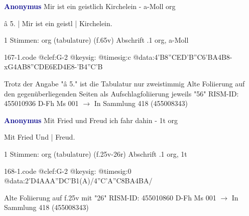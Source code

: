 \documentclass[twocolumn]{book}
\begin{document}
\newline \par \vspace{7pt} \textcolor{darkblue}{\textbf{Anonymus  }}
\newline Mir ist ein geistlich Kirchelein - a-Moll
\newline org
\newline \begin{itshape}[f.65v, at left:] â 5. | Mir ist ein geistl | Kirchelein.\end{itshape} 
\newline \textcolor{darkblue}{}  1 Stimmen: org (tabulature)  (f.65v)
\newline Abschrift
.1  org, a-Moll  
\begin{filecontents*}{167-1.code}
@clef:G-2
@keysig:
@timesig:c
@data:4'B{8''CE}{D'B''C6'BA}4B8-xG4AB{8''CDE6ED}4E8-'B4''C'B
\end{filecontents*}
\newline
%
\newline Trotz der Angabe "â 5." ist die Tabulatur nur zweistimmig
\newline Alte Foliierung auf den gegenüberliegenden Seiten als Aufschlagfoliierung jeweils "56"
\newline RISM-ID: 455010936
\newline D-Fh  Ms 001
\newline $\rightarrow$ In Sammlung 418 (455008343)
      
\newline \par \vspace{7pt} \textcolor{darkblue}{\textbf{Anonymus  }}
\newline Mit Fried und Freud ich fahr dahin - 1t
\newline org
\newline \begin{itshape}[f.25v, at left:] Mit Fried Und | Freud.\end{itshape} 
\newline \textcolor{darkblue}{}  1 Stimmen: org (tabulature)  (f.25v-26r)
\newline Abschrift
.1  org, 1t  
\begin{filecontents*}{168-1.code}
@clef:G-2
@keysig:
@timesig:0
@data:2'D4AAA''DC'B1(A)/4''C'A''C{8BA}4BA/
\end{filecontents*}
\newline
%
\newline Alte Foliierung auf f.25v mit "26"
\newline RISM-ID: 455010860
\newline D-Fh  Ms 001
\newline $\rightarrow$ In Sammlung 418 (455008343)
      
\end{document}
